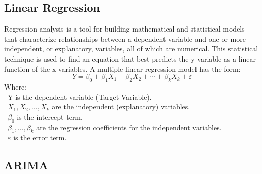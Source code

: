 \documentclass{ieeeojies}
\begin{document}
\subsection{Linear Regression}
Regression analysis is a tool for building mathematical and statistical models that characterize relationships between a dependent variable and one or more independent, or explanatory, variables, all of which are numerical. This statistical technique is used to find an equation that best predicts the y variable as a linear function of the x variables.
A multiple linear regression model has the form: 
\[Y=\beta_0+\beta_1X_1+\beta_2X_2+\cdots+\beta_kX_k+\varepsilon\]
Where:\\
	\indent\textbullet\ Y is the dependent variable (Target Variable).\\
	\indent\textbullet\ \(X_1, X_2, \ldots, X_k\) are the independent (explanatory) variables.\\
	\indent\textbullet\ \(\beta_0\) is the intercept term.\\
	\indent\textbullet\ \(\beta_1,..., \beta_k\) are the regression coefficients for the independent variables.\\
	\indent\textbullet\ \(\varepsilon\) is the error term.
\subsection{ARIMA}
\end{document}
